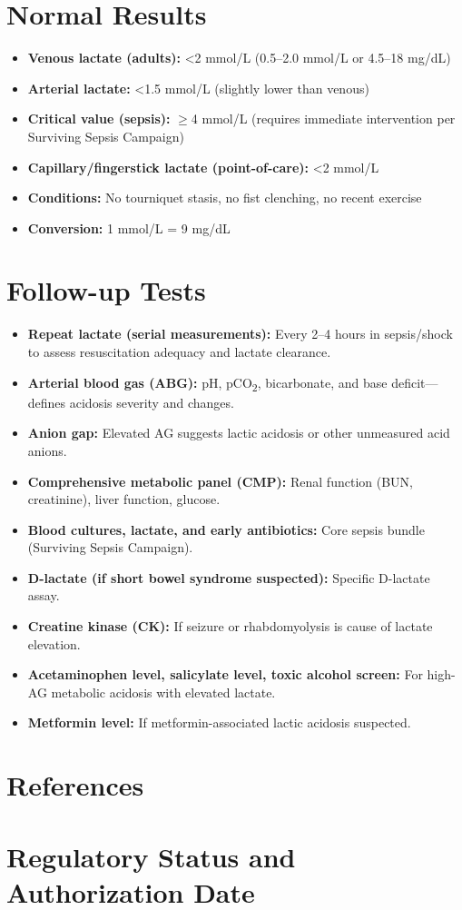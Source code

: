 \section*{Normal Results}
\begin{itemize}
  \item \textbf{Venous lactate (adults):} <2 mmol/L (0.5--2.0 mmol/L or 4.5--18 mg/dL) \cite{wallach2022interpretation}
  \item \textbf{Arterial lactate:} <1.5 mmol/L (slightly lower than venous)
  \item \textbf{Critical value (sepsis):} $\geq$4 mmol/L (requires immediate intervention per Surviving Sepsis Campaign)
  \item \textbf{Capillary/fingerstick lactate (point-of-care):} <2 mmol/L
  \item \textbf{Conditions:} No tourniquet stasis, no fist clenching, no recent exercise
  \item \textbf{Conversion:} 1 mmol/L = 9 mg/dL
\end{itemize}

\section*{Follow-up Tests}
\begin{itemize}
  \item \textbf{Repeat lactate (serial measurements):} Every 2--4 hours in sepsis/shock to assess resuscitation adequacy and lactate clearance.
  \item \textbf{Arterial blood gas (ABG):} pH, pCO\textsubscript{2}, bicarbonate, and base deficit---defines acidosis severity and changes.
  \item \textbf{Anion gap:} Elevated AG suggests lactic acidosis or other unmeasured acid anions.
  \item \textbf{Comprehensive metabolic panel (CMP):} Renal function (BUN, creatinine), liver function, glucose.
  \item \textbf{Blood cultures, lactate, and early antibiotics:} Core sepsis bundle (Surviving Sepsis Campaign).
  \item \textbf{D-lactate (if short bowel syndrome suspected):} Specific D-lactate assay.
  \item \textbf{Creatine kinase (CK):} If seizure or rhabdomyolysis is cause of lactate elevation.
  \item \textbf{Acetaminophen level, salicylate level, toxic alcohol screen:} For high-AG metabolic acidosis with elevated lactate.
  \item \textbf{Metformin level:} If metformin-associated lactic acidosis suspected.
\end{itemize}

\section*{References}



\clearpage
\section*{Regulatory Status and Authorization Date}

\clearpage
